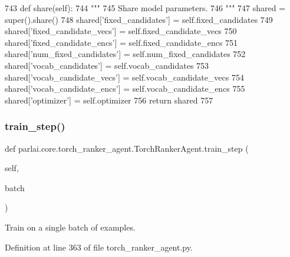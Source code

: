 \begin{DoxyCode}
743     \textcolor{keyword}{def }share(self):
744         \textcolor{stringliteral}{"""}
745 \textcolor{stringliteral}{        Share model parameters.}
746 \textcolor{stringliteral}{        """}
747         shared = super().share()
748         shared[\textcolor{stringliteral}{'fixed\_candidates'}] = self.fixed\_candidates
749         shared[\textcolor{stringliteral}{'fixed\_candidate\_vecs'}] = self.fixed\_candidate\_vecs
750         shared[\textcolor{stringliteral}{'fixed\_candidate\_encs'}] = self.fixed\_candidate\_encs
751         shared[\textcolor{stringliteral}{'num\_fixed\_candidates'}] = self.num\_fixed\_candidates
752         shared[\textcolor{stringliteral}{'vocab\_candidates'}] = self.vocab\_candidates
753         shared[\textcolor{stringliteral}{'vocab\_candidate\_vecs'}] = self.vocab\_candidate\_vecs
754         shared[\textcolor{stringliteral}{'vocab\_candidate\_encs'}] = self.vocab\_candidate\_encs
755         shared[\textcolor{stringliteral}{'optimizer'}] = self.optimizer
756         \textcolor{keywordflow}{return} shared
757 
\end{DoxyCode}
\mbox{\label{classparlai_1_1core_1_1torch__ranker__agent_1_1TorchRankerAgent_a05ddf921f386f21116ec0ef50796987a}} 
\subsubsection{\texorpdfstring{train\+\_\+step()}{train\_step()}}
{\footnotesize\ttfamily def parlai.\+core.\+torch\+\_\+ranker\+\_\+agent.\+Torch\+Ranker\+Agent.\+train\+\_\+step (\begin{DoxyParamCaption}\item[{}]{self,  }\item[{}]{batch }\end{DoxyParamCaption})}

\begin{DoxyVerb}Train on a single batch of examples.
\end{DoxyVerb}
 

Definition at line 363 of file torch\+\_\+ranker\+\_\+agent.\+py.


